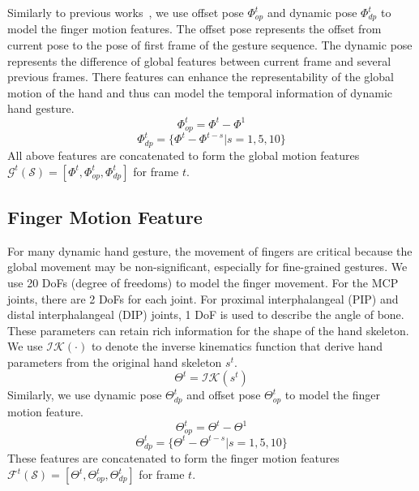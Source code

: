 \documentclass{article}
\begin{document}
Similarly to previous works~\cite{chen2016novel}, we use offset pose $\Phi_{op}^t$ and dynamic pose $\Phi_{dp}^t$ to model the finger motion features. The offset pose represents the offset from current pose to the pose of first frame of the gesture sequence. The dynamic pose represents the difference of global features between current frame and several previous frames. There features can enhance the representability of the global motion of the hand and thus can model the temporal information of dynamic hand gesture.
\begin{equation}
\label{eq:gop}
\Phi_{op}^t = \Phi^t - \Phi^1
\end{equation}
\begin{equation}
\label{eq:gdp}
\Phi_{dp}^t = \{\Phi^t - \Phi^{t-s}|s=1,5,10\}
\end{equation}
All above features are concatenated to form the global motion features $\mathcal{G}^t(\mathcal{S})=[\Phi^t, \Phi_{op}^t, \Phi_{dp}^t]$ for frame $t$.

\subsection{Finger Motion Feature}
\label{sec:fingerfeature}
For many dynamic hand gesture, the movement of fingers are critical because the global movement may be non-significant, especially for fine-grained gestures.
We use 20 DoFs (degree of freedoms) to model the finger movement. For the MCP joints, there are 2 DoFs for each joint. For proximal interphalangeal (PIP) and distal interphalangeal (DIP) joints, 1 DoF is used to describe the angle of bone. These parameters can retain rich information for the shape of the hand skeleton. We use $\mathcal{IK}(\cdot)$ to denote the inverse kinematics function that derive hand parameters from the original hand skeleton $s^t$.
\begin{equation}
\label{eq:ik}
\Theta^t = \mathcal{IK}(s^t)
\end{equation}
Similarly, we use dynamic pose $\Theta_{dp}^t$ and offset pose $\Theta_{op}^t$ to model the finger motion feature.
\begin{equation}
\label{eq:fop}
\Theta_{op}^t = \Theta^t - \Theta^1
\end{equation}
\begin{equation}
\label{eq:fdp}
\Theta_{dp}^t = \{\Theta^t - \Theta^{t-s} | s=1,5,10\}
\end{equation}
These features are concatenated to form the finger motion features $\mathcal{F}^t(\mathcal{S})=[\Theta^t, \Theta_{op}^t, \Theta_{dp}^t]$ for frame $t$.
\end{document}
